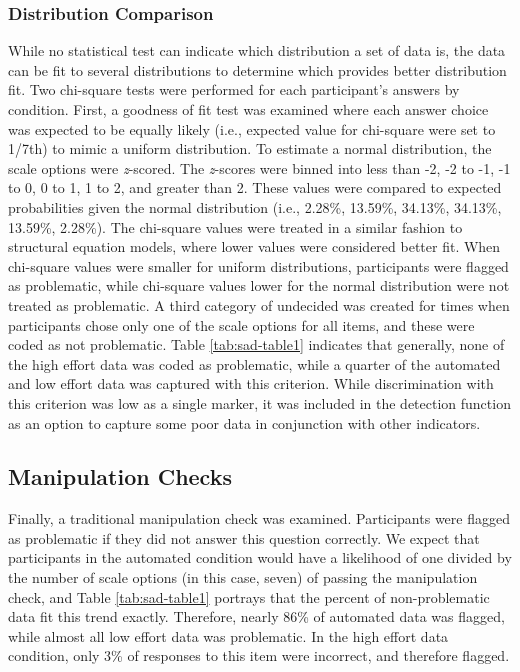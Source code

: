 \documentclass[english,man]{apa6}
\theoremstyle{definition}
\theoremstyle{definition}
\theoremstyle{definition}
\theoremstyle{remark}
\begin{document}
\subsubsection{Distribution Comparison}\label{distribution-comparison}

While no statistical test can indicate which distribution a set of data
is, the data can be fit to several distributions to determine which
provides better distribution fit. Two chi-square tests were performed
for each participant's answers by condition. First, a goodness of fit
test was examined where each answer choice was expected to be equally
likely (i.e., expected value for chi-square were set to 1/7th) to mimic
a uniform distribution. To estimate a normal distribution, the scale
options were \emph{z}-scored. The \emph{z}-scores were binned into less
than -2, -2 to -1, -1 to 0, 0 to 1, 1 to 2, and greater than 2. These
values were compared to expected probabilities given the normal
distribution (i.e., 2.28\%, 13.59\%, 34.13\%, 34.13\%, 13.59\%, 2.28\%).
The chi-square values were treated in a similar fashion to structural
equation models, where lower values were considered better fit. When
chi-square values were smaller for uniform distributions, participants
were flagged as problematic, while chi-square values lower for the
normal distribution were not treated as problematic. A third category of
undecided was created for times when participants chose only one of the
scale options for all items, and these were coded as not problematic.
Table \ref{tab:sad-table1} indicates that generally, none of the high
effort data was coded as problematic, while a quarter of the automated
and low effort data was captured with this criterion. While
discrimination with this criterion was low as a single marker, it was
included in the detection function as an option to capture some poor
data in conjunction with other indicators.

\subsection{Manipulation Checks}\label{manipulation-checks}

Finally, a traditional manipulation check was examined. Participants
were flagged as problematic if they did not answer this question
correctly. We expect that participants in the automated condition would
have a likelihood of one divided by the number of scale options (in this
case, seven) of passing the manipulation check, and Table
\ref{tab:sad-table1} portrays that the percent of non-problematic data
fit this trend exactly. Therefore, nearly 86\% of automated data was
flagged, while almost all low effort data was problematic. In the high
effort data condition, only 3\% of responses to this item were
incorrect, and therefore flagged.
\end{document}
